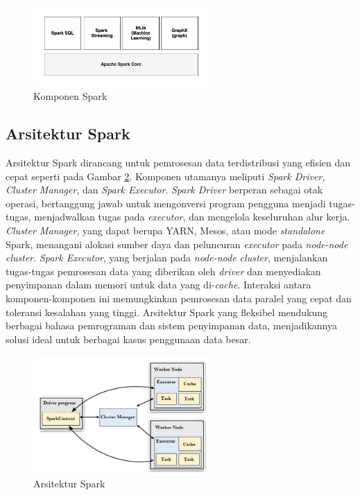 \begin{figure}[h]
    \centering
    \includegraphics[width=0.6\textwidth]{figures/ch02/spark-contain}
    \caption{Komponen Spark}
    \label{fig:spark-component}
\end{figure}

\subsection{Arsitektur Spark}

Arsitektur Spark dirancang untuk pemrosesan data terdistribusi yang efisien dan cepat seperti pada Gambar \ref{fig:spark-arch}. Komponen utamanya meliputi \textit{Spark Driver, Cluster Manager}, dan \textit{Spark Executor}. \textit{Spark Driver} berperan sebagai otak operasi, bertanggung jawab untuk mengonversi program pengguna menjadi tugas-tugas, menjadwalkan tugas pada \textit{executor}, dan mengelola keseluruhan alur kerja. \textit{Cluster Manager}, yang dapat berupa YARN, Mesos, atau mode \textit{standalone} Spark, menangani alokasi sumber daya dan peluncuran \textit{executor} pada \textit{node-node cluster}. \textit{Spark Executor}, yang berjalan pada \textit{node-node cluster}, menjalankan tugas-tugas pemrosesan data yang diberikan oleh \textit{driver} dan menyediakan penyimpanan dalam memori untuk data yang di-\textit{cache}. Interaksi antara komponen-komponen ini memungkinkan pemrosesan data paralel yang cepat dan toleransi kesalahan yang tinggi. Arsitektur Spark yang fleksibel mendukung berbagai bahasa pemrograman dan sistem penyimpanan data, menjadikannya solusi ideal untuk berbagai kasus penggunaan data besar.

\begin{figure}[h]
    \centering
    \includegraphics[width=0.6\textwidth]{figures/ch02/spark-arch.jpeg}
    \caption{Arsitektur Spark}
    \label{fig:spark-arch}
\end{figure}

